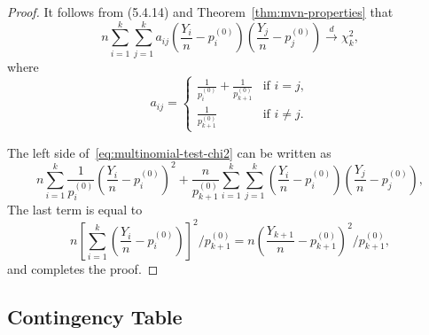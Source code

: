 \begin{proof}
	It follows from (5.4.14) and Theorem~\ref{thm:mvn-properties} that
	\begin{equation}
		\label{eq:multinomial-test-chi2}
		n\sum_{i=1}^{k}\sum_{j=1}^{k}a_{ij}\left(\frac{Y_i}{n}-p_i^{(0)}\right)\left(\frac{Y_j}{n}-p_j^{(0)}\right)\stackrel{d}{\rightarrow}\chi_k^2,
	\end{equation}
	where
	\begin{equation*}
		a_{ij}=\begin{cases}
			\frac{1}{p_{i}^{(0)}}+\frac{1}{p_{k+1}^{(0)}} & \text{if }i=j,     \\
			\frac{1}{p_{k+1}^{(0)}}                       & \text{if }i\neq j.
		\end{cases}
	\end{equation*}

	The left side of~\eqref{eq:multinomial-test-chi2} can be written as
	\begin{equation*}
		n\sum_{i=1}^{k}\frac{1}{p_i^{(0)}}\left(\frac{Y_i}{n}-p_i^{(0)}\right)^2+\frac{n}{p_{k+1}^{(0)}}\sum_{i=1}^{k}\sum_{j=1}^k\left(\frac{Y_i}{n}-p_i^{(0)}\right)\left(\frac{Y_j}{n}-p_j^{(0)}\right),
	\end{equation*}
	The last term is equal to
	\begin{equation*}
		n\left[\sum_{i=1}^k\left(\frac{Y_i}{n}-p_i^{(0)}\right)\right]^2/p_{k+1}^{(0)}=n\left(\frac{Y_{k+1}}{n}-p_{k+1}^{(0)}\right)^2/p_{k+1}^{(0)},
	\end{equation*}
	and completes the proof.
\end{proof}

\subsection{Contingency Table}
